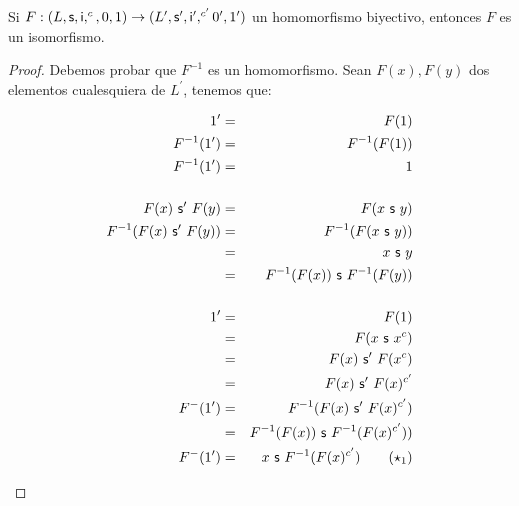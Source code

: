   \begin{lemma} \label{lemma_16}
    \PN Si $F:(L, \mathsf{s}, \mathsf{i}, ^{c}, 0, 1) \rightarrow (L^{\prime}, \mathsf{s}^{\prime}, \mathsf{i}^{\prime}, ^{c^{\prime}} 0^{\prime}, 1^{\prime})$ un homomorfismo biyectivo, entonces $F$ es un isomorfismo.
  \end{lemma}
  \begin{proof}
      \PN Debemos probar que $F^{-1}$ es un homomorfismo. Sean $F(x), F(y)$ dos elementos cualesquiera de $L^{\prime}$,
      tenemos que:
      \pagebreak
      \begin{multicols}{2}
        \begin{eqnarray*}
          1^{\prime} &=& F(1) \\
          F^{-1}(1^{\prime}) &=& F^{-1}(F(1)) \\
          F^{-1}(1^{\prime}) &=& 1 \\
          \\
          F(x) \ \SU^{\prime} \ F(y) &=& F(x \ \SU \ y) \\
          F^{-1}(F(x) \ \SU^{\prime} \ F(y)) &=& F^{-1}(F(x \ \SU \ y)) \\
          &=& x \ \SU \ y \\
          &=& F^{-1}(F(x)) \ \SU \ F^{-1}(F(y)) \\
          \\
          1^{\prime} &=& F(1) \\
          &=& F(x \ \SU \ x^{c}) \\
          &=& F(x) \ \SU^{\prime} \ F(x^{c}) \\
          &=& F(x) \ \SU^{\prime} \ F(x)^{c^{\prime}} \\
          F^{-}(1^{\prime}) &=& F^{-1}(F(x) \ \SU^{\prime} \ F(x)^{c^{\prime}}) \\
          &=& F^{-1}(F(x)) \ \SU \ F^{-1}(F(x)^{c^{\prime}})) \\
          F^{-}(1^{\prime}) &=& x \ \SU \ F^{-1}(F(x)^{c^{\prime}}) \qquad (\star_{1})
        \end{eqnarray*}


\end{multicols}
\end{proof}
